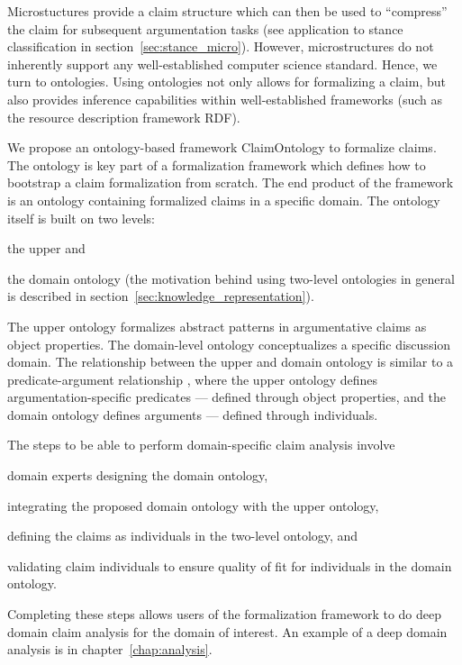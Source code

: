 Microstuctures provide a claim structure which can then be used 
to ``compress'' the claim for subsequent argumentation tasks
(see application to stance classification in section~\ref{sec:stance_micro}).
However, microstructures do not inherently support any
well-established computer science standard. 
Hence, we turn to ontologies. Using ontologies not only allows for 
formalizing a claim, but also provides inference capabilities within
well-established frameworks (such as the resource description framework RDF). 

We propose an ontology-based framework ClaimOntology to formalize claims. The
ontology is key part of a formalization framework which defines how to
bootstrap a claim formalization from scratch. The end product of the framework
is an ontology containing formalized claims in a specific domain. 
The ontology itself is built on two levels: 
\begin{enumerate*}[label=(\arabic*)]
\item the upper and 
\item the domain ontology 
(the motivation behind using two-level ontologies in general is described in
		section~\ref{sec:knowledge_representation}). 
\end{enumerate*}
The upper ontology formalizes abstract patterns in argumentative
claims as object properties. The domain-level ontology conceptualizes 
a specific discussion domain. The relationship between the upper 
and domain ontology is similar to a predicate-argument
relationship \citep{hindle1990noun}, where the upper ontology
defines argumentation-specific predicates --- defined through object properties, 
and the domain ontology defines arguments --- defined through 
individuals. 

The steps to be able to perform domain-specific claim analysis
involve
\begin{enumerate*}[label=(\arabic*)]
\item domain experts designing the domain ontology,
\item integrating the proposed domain ontology with the upper ontology,
\item defining the claims as individuals in the two-level ontology, and
\item validating claim individuals to ensure quality of fit for
	individuals in the domain ontology.
\end{enumerate*}
Completing these steps allows users of the formalization framework
to do deep domain claim analysis for the domain of interest. 
An example of a deep domain analysis is in chapter~\ref{chap:analysis}.

